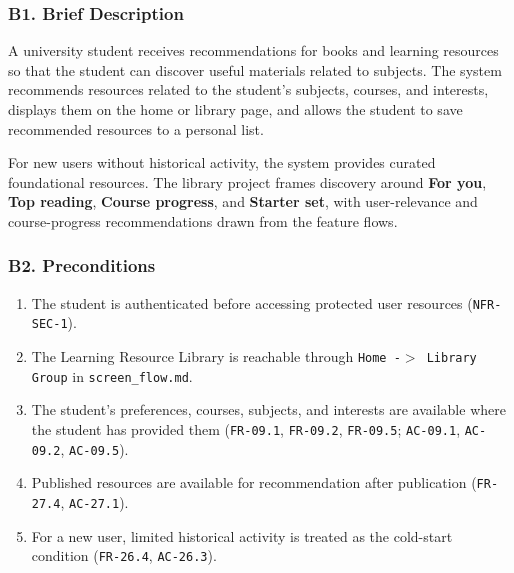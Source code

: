 \documentclass[12pt]{article}
\begin{document}
\hypertarget{sec:b1-brief-description}{}
\subsubsection*{B1. Brief Description}
\par\medskip

A university student receives recommendations for books and learning resources so that the student can discover useful materials related to subjects. The system recommends resources related to the student's subjects, courses, and interests, displays them on the home or library page, and allows the student to save recommended resources to a personal list.
\par\medskip

For new users without historical activity, the system provides curated foundational resources. The library project frames discovery around \textbf{For you}, \textbf{Top reading}, \textbf{Course progress}, and \textbf{Starter set}, with user-relevance and course-progress recommendations drawn from the feature flows.
\par\medskip

\hypertarget{sec:b2-preconditions}{}
\subsubsection*{B2. Preconditions}
\par\medskip

\begin{enumerate}
\item The student is authenticated before accessing protected user resources (\texttt{NFR-SEC-1}).
\item The Learning Resource Library is reachable through \texttt{Home -$>$ Library Group} in \texttt{screen\_flow.md}.
\item The student's preferences, courses, subjects, and interests are available where the student has provided them (\texttt{FR-09.1}, \texttt{FR-09.2}, \texttt{FR-09.5}; \texttt{AC-09.1}, \texttt{AC-09.2}, \texttt{AC-09.5}).
\item Published resources are available for recommendation after publication (\texttt{FR-27.4}, \texttt{AC-27.1}).
\item For a new user, limited historical activity is treated as the cold-start condition (\texttt{FR-26.4}, \texttt{AC-26.3}).
\end{enumerate}
\par\medskip
\end{document}

